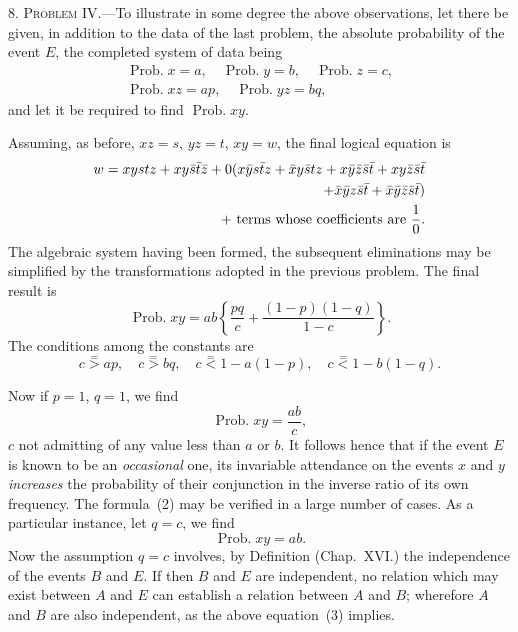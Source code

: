 \documentclass[oneside]{book}
\begin{document}
8. \textsc{Problem} IV.---To illustrate in some degree the above
observations, let there be given, in addition to the data of the
last problem, the absolute probability of the event $E$, the
completed system of data being
\begin{gather*}
\operatorname{Prob. } x = a, \quad \operatorname{Prob. } y = b, \quad \operatorname{Prob. } z = c, \\
\operatorname{Prob. } xz = ap, \quad \operatorname{Prob. } yz = bq,
\end{gather*}
and let it be required to find $\operatorname{Prob. } xy$.

Assuming, as before, $xz = s$, $yz=t$, $xy = w$, the final logical
equation is
\begin{equation*}
\begin{split}
w = xystz + xy\bar{s}\bar{t}\bar{z}
+ 0(x\bar{y}s\bar{t}z + \bar{x}y\bar{s}tz
  + x\bar{y}\bar{z}\bar{s}\bar{t}+ xy\bar{z}\bar{s}\bar{t}
\hfill \\ \hfill
+ \bar{x}\bar{y}z\bar{s}\bar{t}+ \bar{x}\bar{y}\bar{z}\bar{s}\bar{t})
\\
+ \text{ terms whose coefficients are } \frac{1}{0}.  %
\end{split}
\end{equation*}
The algebraic system having been formed, the subsequent
eliminations may be simplified by the transformations adopted in the
previous problem. The final result is
\begin{equation*}
\operatorname{Prob. } xy
= ab \left\{ \frac{pq}{c} + \frac{(1-p)(1-q)}{1-c} \right\}.  \tag{2}
\end{equation*}
The conditions among the constants are
\begin{equation*}
c \stackrel{=}{>} ap, \quad
c \stackrel{=}{>} bq, \quad
c \stackrel{=}{<} 1 - a(1 - p), \quad
c \stackrel{=}{<} 1-b(1-q).
\end{equation*}

Now if $p = 1$, $q = 1$, we find
\begin{equation*}
\operatorname{Prob. } xy = \frac{ab}{c},
\end{equation*}
$c$ not admitting of any value less than $a$ or $b$. It follows hence
that if the event $E$ is known to be an \textit{occasional} one, its
invariable attendance on the events $x$ and $y$ \textit{increases} the probability
of their conjunction in the inverse ratio of its own frequency.
The formula~(2) may be verified in a large number of cases.
As a particular instance, let $q = c$, we find
\begin{equation*}\tag{3}
\operatorname{Prob. } xy = ab.
\end{equation*}
Now the assumption $q = c$ involves, by Definition (Chap.~XVI.)
the independence of the events $B$ and $E$. If then $B$ and $E$ are
independent, no relation which may exist between $A$ and $E$ can
establish a relation between $A$ and $B$; wherefore $A$ and $B$ are
also independent, as the above equation~(3) implies.
\end{document}
